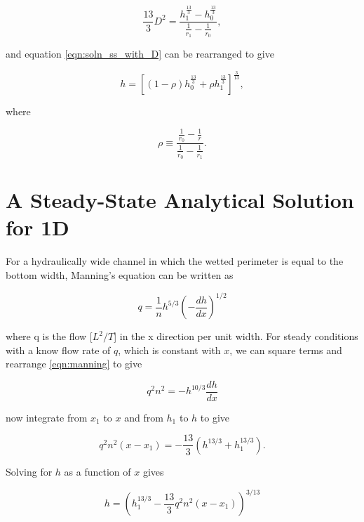 \documentclass[fleqn]{article}
\begin{document}
\begin{equation}
  \frac{13}{3} D^{2} = \frac{h^{\frac{13}{3}}_{1} - h^{\frac{13}{3}}_{0}}{\frac{1}{r_{1}} - \frac{1}{r_{0}}},
  \label{eqn:D_evaluated}
\end{equation}

\noindent and equation \ref{eqn:soln_ss_with_D} can be rearranged to give

\begin{equation}
  h = \left [ \left (1 - \rho \right ) h^{\frac{13}{3}}_{0} + \rho h^{\frac{13}{3}}_{1} \right ]^{\frac{3}{13}} ,
  \label{eqn:soln_ss}
\end{equation}

\noindent where 

\begin{equation}
  \rho \equiv \frac{\frac{1}{r_{0}} - \frac{1}{r}}{\frac{1}{r_{0}} - \frac{1}{r_{1}}} .
  \label{eqn:rho_defined}
\end{equation}

\section{A Steady-State Analytical Solution for 1D}

For a hydraulically wide channel in which the wetted perimeter is equal to the bottom width, Manning's equation can be written as

\begin{equation}
  q = \frac{1}{n} h^{5/3} \left ( - \frac{dh}{dx} \right )^ {1/2}
  \label{eqn:manning}
\end{equation}

\noindent where q is the flow [$L^2/T$] in the x direction per unit width.  For steady conditions with a know flow rate of $q$, which is constant with $x$, we can square terms and rearrange \ref{eqn:manning} to give 

\begin{equation}
  q^2 n^2 = - h^{10/3} \frac{dh}{dx}
  \label{eqn:manning2}
\end{equation}

\noindent now integrate from $x_1$ to $x$ and from $h_1$ to $h$ to give

\begin{equation}
  q^2 n^2 (x - x_1) = - \frac{13}{3} \left ( h^{13/3} + h_1^{13/3} \right ).
  \label{eqn:manning3}
\end{equation}

\noindent Solving for $h$ as a function of $x$ gives

\begin{equation}
  h = \left ( h_1^{13/3} - \frac{13}{3} q^2 n^2 (x - x_1) \right )^{3/13}
  \label{eqn:manning4}
\end{equation}
\end{document}
